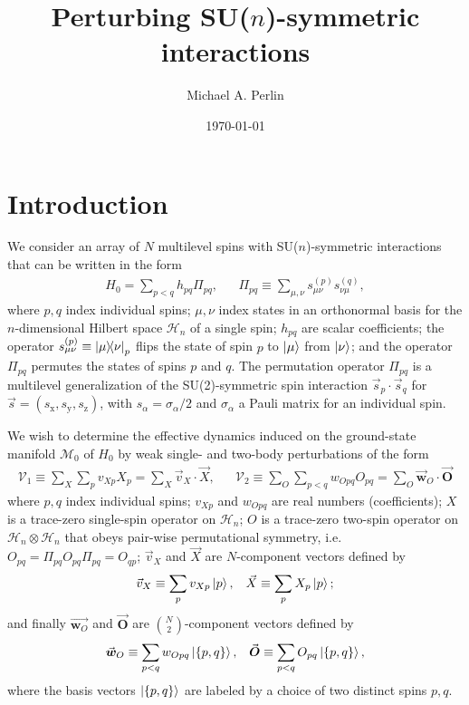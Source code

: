 \documentclass[nofootinbib,notitlepage,11pt]{revtex4-2}
\newcommand{\p}[1]{\left(#1\right)} %
\renewcommand{\set}[1]{\left\{#1\right\}} %
\renewcommand{\c}{\cdot} %
\newcommand{\m}{\bm} %
\renewcommand{\v}{\vec} %
\newcommand{\1}{\mathds{1}}
\newcommand{\x}{\text{x}}
\newcommand{\y}{\text{y}}
\newcommand{\z}{\text{z}}
\renewcommand{\H}{\mathcal{H}}
\newcommand{\M}{\mathcal{M}}
\newcommand{\V}{\mathcal{V}}
\begin{document}
\title{Perturbing SU($n$)-symmetric interactions}%
\author{Michael A. Perlin}%
\date{\today}

\maketitle

\tableofcontents

\section{Introduction}

We consider an array of $N$ multilevel spins with SU($n$)-symmetric
interactions that can be written in the form
\begin{align}
  H_0 = \sum_{p<q} h_{pq} \Pi_{pq},
  &&
  \Pi_{pq} \equiv \sum_{\mu,\nu} s_{\mu\nu}^{(p)} s_{\nu\mu}^{(q)},
  \label{eq:ints}
\end{align}
where $p,q$ index individual spins; $\mu,\nu$ index states in an
orthonormal basis for the $n$-dimensional Hilbert space $\H_n$ of a
single spin; $h_{pq}$ are scalar coefficients; the operator
$s_{\mu\nu}^{(p)}\equiv\op{\mu}{\nu}_p$ flips the state of spin $p$ to
$\ket\mu$ from $\ket\nu$; and the operator $\Pi_{pq}$ permutes the
states of spins $p$ and $q$.  The permutation operator $\Pi_{pq}$ is a
multilevel generalization of the SU(2)-symmetric spin interaction
$\v s_p\c\v s_q$ for $\v s=\p{s_\x,s_\y,s_\z}$, with
$s_\alpha=\sigma_\alpha/2$ and $\sigma_\alpha$ a Pauli matrix for an
individual spin.

We wish to determine the effective dynamics induced on the
ground-state manifold $\M_0$ of $H_0$ by weak single- and two-body
perturbations of the form
\begin{align}
  \V_1 \equiv \sum_X \sum_p v_{Xp} X_p = \sum_X \v v_X\c\v X,
  &&
  \V_2 \equiv \sum_O \sum_{p<q} w_{Opq} O_{pq}
  = \sum_O \v{\m w}_O\c \v{\m O}
  \label{eq:perturbations}
\end{align}
where $p,q$ index individual spins; $v_{Xp}$ and $w_{Opq}$ are real
numbers (coefficients); $X$ is a trace-zero single-spin operator on
$\H_n$; $O$ is a trace-zero two-spin operator on $\H_n\otimes\H_n$
that obeys pair-wise permutational symmetry,
i.e.~$O_{pq} = \Pi_{pq} O_{pq} \Pi_{pq} = O_{qp}$; $\v v_X$ and $\v X$
are $N$-component vectors defined by
\begin{align}
  \v v_X \equiv \sum_p v_{Xp} \ket{p},
  &&
  \v X \equiv \sum_p X_p \ket{p};
\end{align}
and finally $\v{\m w_O}$ and $\v{\m O}$ are ${N \choose 2}$-component
vectors defined by
\begin{align}
  \v{\m w}_O \equiv \sum_{p<q} w_{Opq} \ket{\set{p,q}},
  &&
  \v{\m O} \equiv \sum_{p<q} O_{pq} \ket{\set{p,q}},
\end{align}
where the basis vectors $\ket{\set{p,q}}$ are labeled by a choice of
two distinct spins $p,q$.
\end{document}
